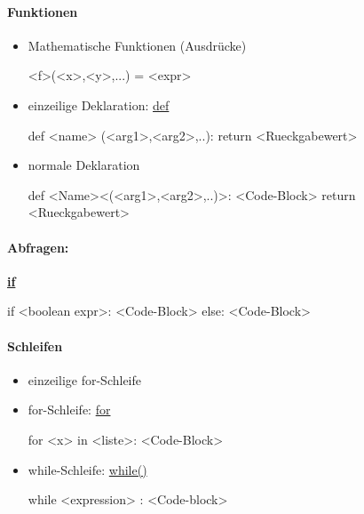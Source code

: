 \documentclass[a4paper,9pt,DIV15,twocolumn]{scrartcl}
\begin{document}
{\paragraph{Funktionen}
\begin{itemize}
 \item Mathematische Funktionen (Ausdrücke)
\begin{sagein}
<f>(<x>,<y>,...) = <expr>
\end{sagein}
    \item einzeilige Deklaration: \href{http://docs.python.org/reference/compound_stmts.html#function-definitions}{def}     
        \begin{sagein}
def <name> (<arg1>,<arg2>,..): return <Rueckgabewert>            
        \end{sagein}
 \item normale Deklaration
\begin{sagein}
def <Name><(<arg1>,<arg2>,..)>:
    <Code-Block>
    return <Rueckgabewert>
\end{sagein}
\end{itemize}
\paragraph{Abfragen:}\href{http://docs.python.org/reference/compound_stmts.html#the-if-statement}{\textbf{if}}
\begin{sagein}
if <boolean expr>:
    <Code-Block>
else:
    <Code-Block>
\end{sagein}

\paragraph{Schleifen}
\begin{itemize}
\item einzeilige for-Schleife
    \begin{sagein}
    \end{sagein}
\item for-Schleife: \href{http://docs.python.org/tutorial/controlflow.html#for-statements}{for}
    \begin{sagein}
for <x> in <liste>:
    <Code-Block>
    \end{sagein}
  \item while-Schleife: \href{http://docs.python.org/reference/compound_stmts.html#the-while-statement}{while()}
\begin{sagein}
while <expression> :
    <Code-block>
\end{sagein}
\end{itemize}

}
\end{document}
